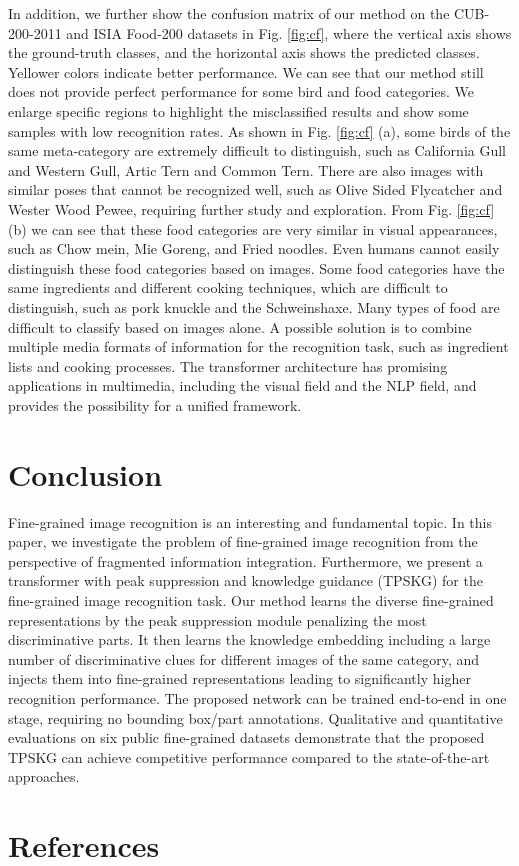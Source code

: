 \documentclass[5p,twocolumn]{elsarticle}
\begin{document}
In addition, we further show the confusion matrix of our method on the CUB-200-2011 and ISIA Food-200 datasets in Fig. \ref{fig:cf}, where the vertical axis shows the ground-truth classes, and the horizontal axis shows the predicted classes. Yellower colors indicate better performance. 
We can see that our method still does not provide perfect performance for some bird and food categories. We enlarge specific regions to highlight the misclassified results and show some samples with low recognition rates. 
As shown in Fig. \ref{fig:cf} (a), some birds of the same meta-category are extremely difficult to distinguish, such as California Gull and Western Gull, Artic Tern and Common Tern. There are also images with similar poses that cannot be recognized well, such as Olive Sided Flycatcher and Wester Wood Pewee, requiring further study and exploration.
From Fig. \ref{fig:cf} (b) we can see that these food categories are very similar in visual appearances, such as Chow mein, Mie Goreng, and Fried noodles. Even humans cannot easily distinguish these food categories based on images. Some food categories have the same ingredients and different cooking techniques, which are difficult to distinguish, such as pork knuckle and the Schweinshaxe.
Many types of food are difficult to classify based on images alone. A possible solution is to combine multiple media formats of information for the recognition task, such as ingredient lists and cooking processes. The transformer architecture has promising applications in multimedia, including the visual field and the NLP field, and provides the possibility for a unified framework. 



\section{Conclusion} \label{sec.con}
Fine-grained image recognition is an interesting and fundamental topic. 
In this paper, we investigate the problem of fine-grained image recognition from the perspective of fragmented information integration. Furthermore, we present a transformer with peak suppression and knowledge guidance (TPSKG) for the fine-grained image recognition task. Our method learns the diverse fine-grained representations by the peak suppression module penalizing the most discriminative parts. It then learns the knowledge embedding including a large number of discriminative clues for different images of the same category, and injects them into fine-grained representations leading to significantly higher recognition performance. The proposed network  can be trained end-to-end in one stage, requiring no bounding box/part annotations. Qualitative and quantitative
evaluations on six public fine-grained datasets demonstrate that the proposed TPSKG can achieve competitive performance compared to the state-of-the-art approaches.



\section*{References}


\end{document}

